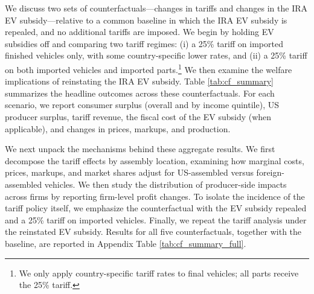 \documentclass[11pt]{article}
\begin{document}

We discuss two sets of counterfactuals—changes in tariffs and changes in the IRA EV subsidy—relative to a common baseline in which the IRA EV subsidy is repealed, and no additional tariffs are imposed. We begin by holding EV subsidies off and comparing two tariff regimes: (i) a 25\% tariff on imported finished vehicles only, with some country-specific lower rates, and (ii) a 25\% tariff on both imported vehicles and imported parts.\footnote{We only apply country-specific tariff rates to final vehicles; all parts receive the 25\% tariff.} We then examine the welfare implications of reinstating the IRA EV subsidy. Table \ref{tab:cf_summary} summarizes the headline outcomes across these counterfactuals. For each scenario, we report consumer surplus (overall and by income quintile), US producer surplus, tariff revenue, the fiscal cost of the EV subsidy (when applicable), and changes in prices, markups, and production.

We next unpack the mechanisms behind these aggregate results. We first decompose the tariff effects by assembly location, examining how marginal costs, prices, markups, and market shares adjust for US-assembled versus foreign-assembled vehicles. We then study the distribution of producer-side impacts across firms by reporting firm-level profit changes. To isolate the incidence of the tariff policy itself, we emphasize the counterfactual with the EV subsidy repealed and a 25\% tariff on imported vehicles. Finally, we repeat the tariff analysis under the reinstated EV subsidy. Results for all five counterfactuals, together with the baseline, are reported in Appendix Table \ref{tab:cf_summary_full}.


\end{document}
